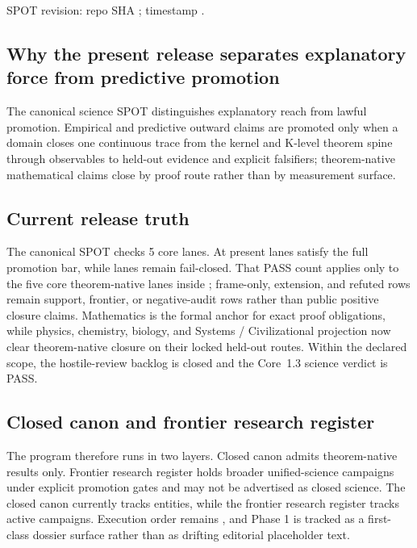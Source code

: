 SPOT revision: repo SHA ; timestamp .

\subsection{Why the present release separates explanatory force from predictive promotion}
The canonical science SPOT distinguishes explanatory reach from lawful promotion. Empirical and predictive outward claims are promoted only when a domain closes one continuous trace from the kernel and K-level theorem spine through observables to held-out evidence and explicit falsifiers; theorem-native mathematical claims close by proof route rather than by measurement surface.

\subsection{Current release truth}
The canonical SPOT checks 5 core lanes. At present  lanes satisfy the full promotion bar, while  lanes remain fail-closed.
That PASS count applies only to the five core theorem-native lanes inside ; frame-only, extension, and refuted rows remain support, frontier, or negative-audit rows rather than public positive closure claims.
Mathematics is the formal anchor for exact proof obligations, while physics, chemistry, biology, and Systems / Civilizational projection now clear theorem-native closure on their locked held-out routes. Within the declared  scope, the hostile-review backlog is closed and the Core~1.3 science verdict is PASS.

\subsection{Closed canon and frontier research register}
The program therefore runs in two layers. Closed canon admits theorem-native results only. Frontier research register holds broader unified-science campaigns under explicit promotion gates and may not be advertised as closed science.
The closed canon currently tracks  entities, while the frontier research register tracks  active campaigns.
Execution order remains , and Phase 1 is tracked as a first-class dossier surface rather than as drifting editorial placeholder text.

